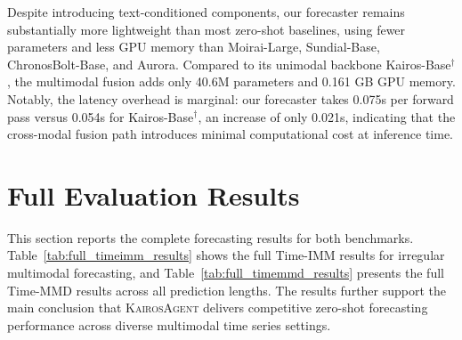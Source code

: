 \documentclass[11pt]{article}
\newcommand{\method}{\textsc{KairosAgent}\xspace}
\begin{document}
\begin{table}[htbp]
\centering
\caption{Inference efficiency of the Stage~II forecaster on a single NVIDIA TITAN RTX (input length 2048, horizon 96). $^\dagger$Kairos-Base with horizon-decoupled heads, serving as the unimodal backbone of our forecaster. Best results are in \textcolor{red}{\textbf{red bold}}, second-best in \textcolor{blue}{\underline{blue underline}}.}
\label{tab:inference_efficiency}
\end{table}

Despite introducing text-conditioned components, our forecaster remains substantially more lightweight than most zero-shot baselines, using fewer parameters and less GPU memory than Moirai-Large, Sundial-Base, ChronosBolt-Base, and Aurora.
Compared to its unimodal backbone Kairos-Base$^\dagger$, the multimodal fusion adds only 40.6M parameters and 0.161 GB GPU memory.
Notably, the latency overhead is marginal: our forecaster takes 0.075s per forward pass versus 0.054s for Kairos-Base$^\dagger$, an increase of only 0.021s, indicating that the cross-modal fusion path introduces minimal computational cost at inference time.

\section{Full Evaluation Results}
\label{app:full_results}

This section reports the complete forecasting results for both benchmarks.
Table~\ref{tab:full_timeimm_results} shows the full Time-IMM results for irregular multimodal forecasting, and Table~\ref{tab:full_timemmd_results} presents the full Time-MMD results across all prediction lengths.
The results further support the main conclusion that \method delivers competitive zero-shot forecasting performance across diverse multimodal time series settings.
\end{document}
